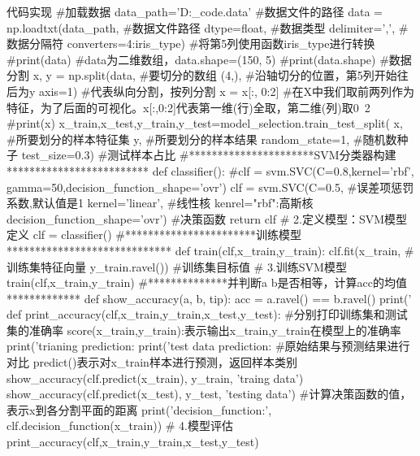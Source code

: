 \documentclass[openbib]{article}
\begin{document}
\begin{Python}{代码实现}
#加载数据
data_path='D:\python_code\dataset\iris.data'          #数据文件的路径
data = np.loadtxt(data_path,                                #数据文件路径
				  dtype=float,                              #数据类型
				  delimiter=',',                            #数据分隔符
				  converters={4:iris_type})                 #将第5列使用函数iris_type进行转换
#print(data)                                                #data为二维数组，data.shape=(150, 5)
#print(data.shape)
#数据分割
x, y = np.split(data,                                       #要切分的数组
				(4,),                                       #沿轴切分的位置，第5列开始往后为y
				axis=1)                                     #代表纵向分割，按列分割
x = x[:, 0:2]                                            #在X中我们取前两列作为特征，为了后面的可视化。x[:,0:2]代表第一维(行)全取，第二维(列)取0~2
#print(x)
x_train,x_test,y_train,y_test=model_selection.train_test_split(
						x,              #所要划分的样本特征集
						y,              #所要划分的样本结果
						random_state=1, #随机数种子
						test_size=0.3)  #测试样本占比
#**********************SVM分类器构建*************************
def classifier():
	#clf = svm.SVC(C=0.8,kernel='rbf', gamma=50,decision_function_shape='ovr')
	clf = svm.SVC(C=0.5,                         #误差项惩罚系数,默认值是1
				  kernel='linear',               #线性核 kenrel="rbf":高斯核
				  decision_function_shape='ovr') #决策函数
	return clf
# 2.定义模型：SVM模型定义
clf = classifier()
#***********************训练模型*****************************
def train(clf,x_train,y_train):
	clf.fit(x_train,         #训练集特征向量
			y_train.ravel()) #训练集目标值
# 3.训练SVM模型
train(clf,x_train,y_train)
#**************并判断a b是否相等，计算acc的均值*************
def show_accuracy(a, b, tip):
	acc = a.ravel() == b.ravel()
	print('%
def print_accuracy(clf,x_train,y_train,x_test,y_test):
	#分别打印训练集和测试集的准确率  score(x_train,y_train):表示输出x_train,y_train在模型上的准确率
	print('trianing prediction:%
	print('test data prediction:%
	#原始结果与预测结果进行对比   predict()表示对x_train样本进行预测，返回样本类别
	show_accuracy(clf.predict(x_train), y_train, 'traing data')
	show_accuracy(clf.predict(x_test), y_test, 'testing data')
	#计算决策函数的值，表示x到各分割平面的距离
	print('decision_function:\n', clf.decision_function(x_train))
# 4.模型评估
print_accuracy(clf,x_train,y_train,x_test,y_test)


\end{Python}
\end{document}
